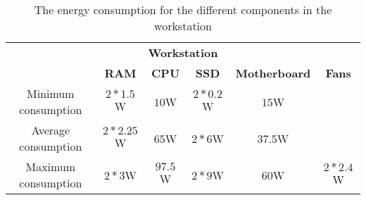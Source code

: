 \begin{table}[ht]
    \centering
    \begin{tabular}{||c | c | c | c | c | c ||}
    \hline
    \multicolumn{6}{||c||}{\textbf{Workstation}}           \\
     & \textbf{RAM}\cite{buildComputerRAM} & \textbf{CPU}\cite{IntelCPUi7} & \textbf{SSD}\cite{tomshardwareSSD} & \textbf{Motherboard}\cite{CPUPowerCum} & \textbf{Fans}\\[0.5ex] \hline\hline
    Minimum consumption & $2 * 1.5$W & $10$W   & $2 * 0.2$W & $15$W & \\
    Average consumption & $2 * 2.25$W & $65$W   & $2 * 6$W & $37.5$W & \\
    Maximum consumption & $2 * 3$W & $97.5$W & $2 * 9$W &  $60$W & $2 * 2.4$W \\ \hline
    \end{tabular}
    \caption{The energy consumption for the different components in the workstation}
    \label{tab:WorkstationEstEnergCon}    
\end{table}